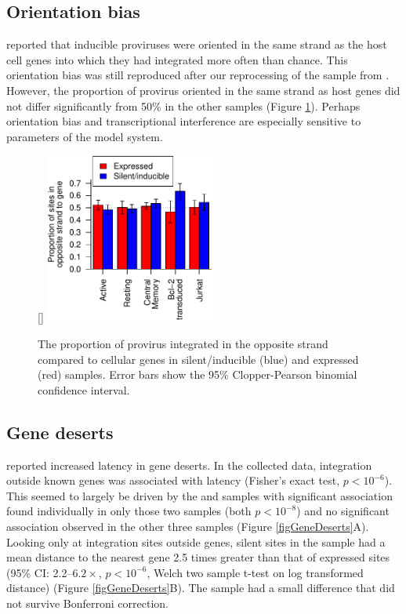 \documentclass[../sherrill-Mix_thesis.tex]{subfiles}
\begin{document}
	\subsection{Orientation bias}
	\citet{Shan2011} reported that inducible proviruses were oriented in the same strand as the host cell genes into which they had integrated more often than chance. This orientation bias was still reproduced after our reprocessing of the \Bcl{} sample from  \citet{Shan2011}. However, the proportion of provirus oriented in the same strand as host genes did not differ significantly from 50\% in the other samples (Figure \ref{figOrient}). Perhaps orientation bias and transcriptional interference are especially sensitive to parameters of the model system.
	\begin{figure}
		\centering
			[\FBwidth]{
				\includegraphics[width=0.5\textwidth]{strandBias.pdf} %
			}{
				\caption[Strand orientation and latency]{The proportion of provirus integrated in the opposite strand compared to cellular genes in silent/inducible (blue) and expressed (red) samples. Error bars show the 95\% Clopper-Pearson binomial confidence interval.}
				\label{figOrient}
			}
	\end{figure}


	\subsection{Gene deserts}
	\citet{Lewinski2005} reported increased latency in gene deserts. In the collected data, integration outside known genes was associated with latency (Fisher's exact test, $p<10^{-6}$).  This seemed to largely be driven by the \Active{} and \Resting{} samples with significant association found individually in only those two samples (both $p<10^{-8}$) and no significant association observed in the other three samples (Figure \ref{figGeneDeserts}A). Looking only at integration sites outside genes, silent sites in the \Resting{} sample had a mean distance to the nearest gene 2.5 times greater than that of expressed sites (95\% CI: 2.2--$6.2\times$, $p<10^{-6}$, Welch two sample t-test on log transformed distance) (Figure \ref{figGeneDeserts}B). The \Active{} sample had a small difference that did not survive Bonferroni correction.
\end{document}
